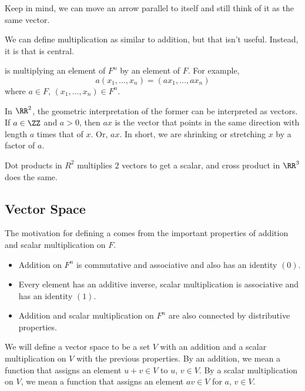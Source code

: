 Keep in mind, we can move an arrow parallel to itself and still think of it as the same vector.

We can define multiplication as similar to addition, but that isn't useful.
Instead, it is  that is central.

\begin{definition}
   is multiplying an element of $F^{n}$ by an element of $F$. For example,
  \begin{equation*}
    a(x_{1}, \dots, x_{n}) = (ax_{1}, \dots, ax_{n})
  \end{equation*}
  where $a \in F$, $(x_{1}, \dots, x_{n}) \in F^{n}$.
\end{definition}

In $\RR^{2}$, the geometric interpretation of the former can be interpreted as vectors. 
If $a \in \ZZ$ and $a > 0$, then $ax$ is the vector that points in the same direction with length $a$ times that of $x$.
Or, $ax$. In short, we are shrinking or stretching $x$ by a factor of $a$.

\begin{remark}
  Dot products in $R^{2}$ multiplies $2$ vectors to get a scalar, and cross product in $\RR^{3}$ does the same.
\end{remark}

\subsection{Vector Space}

The motivation for defining a  comes from the important properties of addition and scalar multiplication on $F$.

\begin{itemize}
  \item Addition on $F^{n}$ is commutative and associative and also has an identity $(0)$.
  \item Every element has an additive inverse, scalar multiplication is associative and has an identity $(1)$.
  \item Addition and scalar multiplication on $F^{n}$ are also connected by distributive properties.
\end{itemize}

  We will define a vector space to be a set $V$ with an addition and a scalar multiplication on $V$ with the previous properties.
By an addition, we mean a function that assigns an element $u + v \in V$ to $u$, $v \in V$. 
By a scalar multiplication on $V$, we mean a function that assigns an element $av \in V$ for $a$, $v \in V$.

